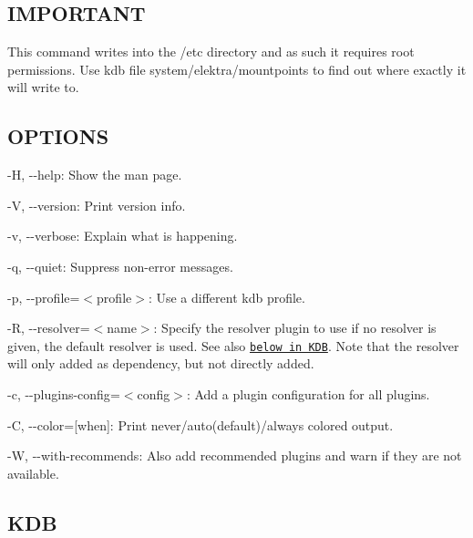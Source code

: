 \subsection*{I\+M\+P\+O\+R\+T\+A\+N\+T}

This command writes into the {\ttfamily /etc} directory and as such it requires root permissions. Use {\ttfamily kdb file system/elektra/mountpoints} to find out where exactly it will write to.

\subsection*{O\+P\+T\+I\+O\+N\+S}


\begin{DoxyItemize}
\item {\ttfamily -\/\+H}, {\ttfamily -\/-\/help}\+: Show the man page.
\item {\ttfamily -\/\+V}, {\ttfamily -\/-\/version}\+: Print version info.
\item {\ttfamily -\/v}, {\ttfamily -\/-\/verbose}\+: Explain what is happening.
\item {\ttfamily -\/q}, {\ttfamily -\/-\/quiet}\+: Suppress non-\/error messages.
\item {\ttfamily -\/p}, {\ttfamily -\/-\/profile}=$<$profile$>$\+: Use a different kdb profile.
\item {\ttfamily -\/\+R}, {\ttfamily -\/-\/resolver}=$<$name$>$\+: Specify the resolver plugin to use if no resolver is given, the default resolver is used. See also \href{#KDB}{\tt below in K\+D\+B}. Note that the resolver will only added as dependency, but not directly added.
\item {\ttfamily -\/c}, {\ttfamily -\/-\/plugins-\/config}=$<$config$>$\+: Add a plugin configuration for all plugins.
\item {\ttfamily -\/\+C}, {\ttfamily -\/-\/color}=\mbox{[}when\mbox{]}\+: Print never/auto(default)/always colored output.
\item {\ttfamily -\/\+W}, {\ttfamily -\/-\/with-\/recommends}\+: Also add recommended plugins and warn if they are not available.
\end{DoxyItemize}

\subsection*{K\+D\+B}


